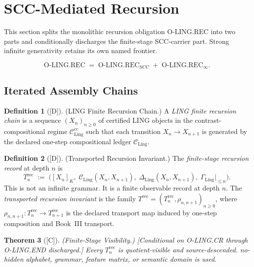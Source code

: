 \documentclass[12pt,oneside]{amsbook}
\theoremstyle{plain}
\newtheorem{theorem}{Theorem}[section]
\theoremstyle{definition}
\newtheorem{definition}[theorem]{Definition}
\theoremstyle{remark}
\newcommand{\status}[1]{\textup{[#1]}}
\begin{document}
\section{SCC-Mediated Recursion}\label{sec:ling-REC-SCC}

This section splits the monolithic recursion obligation O-LING.REC
into two parts and conditionally discharges the finite-stage SCC-carrier
part. Strong infinite generativity retains its own named frontier.

\[
 \mathrm{O\text{-}LING.REC}
 \;=\;
 \mathrm{O\text{-}LING.REC}_{\mathrm{SCC}}
 \;+\;
 \mathrm{O\text{-}LING.REC}_{\infty}.
\]

\subsection{Iterated Assembly Chains}\label{sec:ling-REC-chains}

\begin{definition}[\status{D}]\label{def:ling-rec-chain}
\textup{(LING Finite Recursion Chain.)}
A \emph{LING finite recursion chain} is a sequence
$(X_n)_{n \ge 0}$ of certified LING objects in the
contrast-compositional regime $\mathcal{C}_{\mathrm{Ling}}^{cc}$
such that each transition $X_n \to X_{n+1}$ is generated by the
declared one-step compositional ledger $\mathcal{C}_{\mathrm{Ling}}$.
\end{definition}

\begin{definition}[\status{D}]\label{def:ling-rec-invariant}
\textup{(Transported Recursion Invariant.)}
The \emph{finite-stage recursion record} at depth $n$ is
\[
 T_n^{\mathrm{rec}} \;:=\;
 \bigl(
 [X_n]_K,\;
 \mathcal{C}_{\mathrm{Ling}}(X_n, X_{n+1}),\;
 \Delta_{\mathrm{Ling}}(X_n, X_{n+1}),\;
 \Gamma_{\mathrm{Ling}}|_{\le n}
 \bigr).
\]
This is not an infinite grammar. It is a finite observable record at
depth $n$. The \emph{transported recursion invariant} is the family
$T^{\mathrm{rec}} = (T_n^{\mathrm{rec}}, \rho_{n,n+1})_{n \ge 0}$,
where $\rho_{n,n+1} : T_n^{\mathrm{rec}} \to T_{n+1}^{\mathrm{rec}}$
is the declared transport map induced by one-step composition and
Book~III transport.
\end{definition}

\begin{theorem}[\status{C}]\label{thm:ling-rec-finite-stages-visible}
\textup{(Finite-Stage Visibility.)}
\textup{[Conditional on O-LING.CR through O-LING.END discharged.]}
Every $T_n^{\mathrm{rec}}$ is quotient-visible and source-descended.
no-hidden alphabet, grammar, feature matrix, or semantic domain is
used.
\end{theorem}
\end{document}
